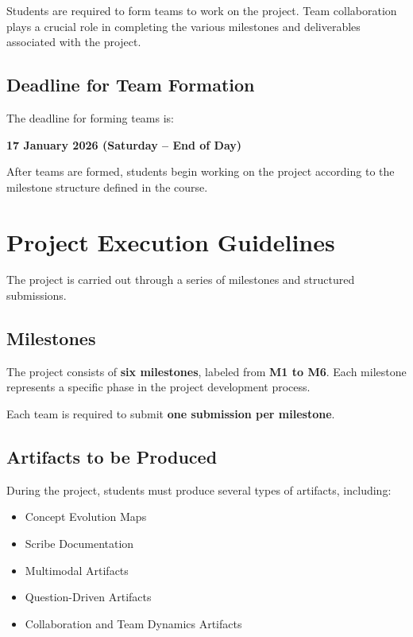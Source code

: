 \documentclass[12pt,a4paper]{article}
\begin{document}
Students are required to form teams to work on the project. Team collaboration plays a crucial role in completing the various milestones and deliverables associated with the project.

\subsection{Deadline for Team Formation}

The deadline for forming teams is:

\begin{center}
\textbf{17 January 2026 (Saturday – End of Day)}
\end{center}

After teams are formed, students begin working on the project according to the milestone structure defined in the course.

\section{Project Execution Guidelines}

The project is carried out through a series of milestones and structured submissions.

\subsection{Milestones}

The project consists of \textbf{six milestones}, labeled from \textbf{M1 to M6}. Each milestone represents a specific phase in the project development process.

Each team is required to submit \textbf{one submission per milestone}.

\subsection{Artifacts to be Produced}

During the project, students must produce several types of artifacts, including:

\begin{itemize}
\item Concept Evolution Maps
\item Scribe Documentation
\item Multimodal Artifacts
\item Question-Driven Artifacts
\item Collaboration and Team Dynamics Artifacts
\end{itemize}
\end{document}
